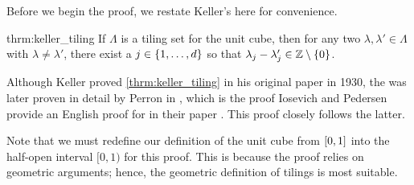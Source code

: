 \documentclass[../thesis.tex]{subfiles}
\begin{document}
Before we begin the proof, we restate Keller's  here for convenience. 
\begin{reptheorem}{thrm:keller_tiling}
    If $\Lambda$ is a tiling set for the unit cube, then for any two $\lambda, \lambda' \in \Lambda$ with $\lambda\neq\lambda'$, there exist a $j\in \{1,\dots,d\}$ so that $\lambda_j-\lambda_j' \in \mathbb{Z}\setminus\{0\}$.
\end{reptheorem}
Although Keller proved \cref{thrm:keller_tiling} in his original paper \cite{kellerUberLuckenloseErfullung1930} in 1930, the  was later proven in detail by Perron in \cite{perronUeberLueckenloseAusfuellung1940}, which is the proof Iosevich and Pedersen provide an English proof for in their paper \cite{iosevichSpectralTilingProperties1998}. This proof closely follows the latter.

Note that we must redefine our definition of the unit cube from $[0,1]$ into the half-open interval $[0,1)$ for this proof. This is because the proof relies on geometric arguments; hence, the geometric definition of tilings is most suitable.
\end{document}
